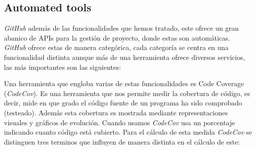 \subsection{Automated tools}
\label{subsec:autotools}
\emph{GitHub} además de las funcionalidades que hemos tratado, este ofrece un gran abanico de APIs para la gestión de proyecto, donde estas son automáticas. \emph{GitHub} ofrece estas de manera categórica, cada categoría se centra en una funcionalidad distinta aunque más de una herramienta ofrece diversos servicios, las más importantes son las siguientes:
\begin{table}[H]
    \centering
    \caption{Categorías de herramientas para la gestión de proyectos en \emph{GitHub}}
    \label{tab:cagGitHub}
\end{table}
Una herramienta que engloba varias de estas funcionalidades es Code Coverage (\emph{CodeCov}). Es una herramienta que nos permite medir la cobertura de código, es decir, mide en que grado el código fuente de un programa ha sido comprobado (testeado). Además esta cobertura es mostrada mediante representaciones visuales y gráficos de evolución. Cuando usamos \emph{CodeCov} usa un porcentaje indicando cuanto código está cubierto. Para el cálculo de esta medida \emph{CodeCov} se distinguen tres terminos que influyen de manera distinta en el cálculo de este:
